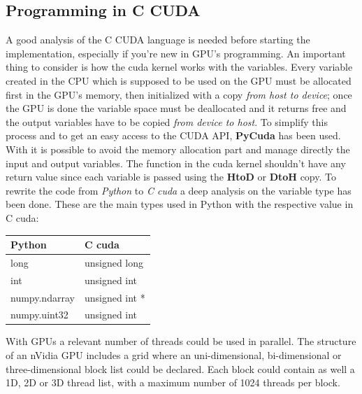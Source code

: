 \documentclass[11pt,conference]{IEEEtran}
\begin{document}
\subsection{Programming in C CUDA}
A good analysis of the C CUDA language is needed before starting the implementation, especially if you're new in GPU's programming. An important thing to consider is how the cuda kernel works with the variables. Every variable created in the CPU which is supposed to be used on the GPU must be allocated first in the GPU's memory, then initialized with a copy \textit{from host to device}; once the GPU is done the variable space must be deallocated and it returns free and the output variables have to be copied \textit{from device to host}. To simplify this process and to get an easy access to the CUDA API, \textbf{PyCuda} has been used. With it is possible to avoid the memory allocation part and manage directly the input and output variables. The function in the cuda kernel shouldn't have any return value since each variable is passed using the \textbf{HtoD} or \textbf{DtoH} copy.
\newline
To rewrite the code from \textit{Python} to \textit{C cuda} a deep analysis on the variable type has been done. These are the main types used in Python with the respective value in C cuda:

\begin{center}
    \begin{tabular}{ | l | l |}
    \hline
    \textbf{Python} & \textbf{C cuda} \\ \hline
    long & unsigned long \\ \hline
    int & unsigned int \\ \hline
    numpy.ndarray & unsigned int * \\ \hline
    numpy.uint32 & unsigned int \\ \hline
    \end{tabular}
\end{center}

With GPUs a relevant number of threads could be used in parallel. The structure of an nVidia GPU includes a grid where an uni-dimensional, bi-dimensional or three-dimensional block list could be declared. Each block could contain as well a 1D, 2D or 3D thread list, with a maximum number of 1024 threads per block.
\end{document}
